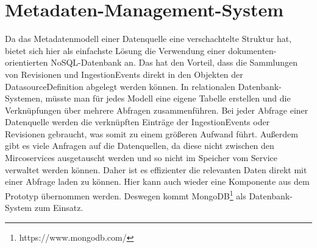 \section{Metadaten-Management-System}

Da das Metadatenmodell einer Datenquelle eine verschachtelte Struktur hat, bietet sich hier als einfachste Lösung die Verwendung einer dokumenten-orientierten NoSQL-Datenbank an.
Das hat den Vorteil, dass die Sammlungen von Revisionen und IngestionEvents direkt in den Objekten der DatasourceDefinition abgelegt werden können.
In relationalen Datenbank-Systemen, müsste man für jedes Modell eine eigene Tabelle erstellen und die Verknüpfungen über mehrere Abfragen zusammenführen.
Bei jeder Abfrage einer Datenquelle werden die verknüpften Einträge der IngestionEvents oder Revisionen gebraucht, was somit zu einem größeren Aufwand führt.
Außerdem gibt es viele Anfragen auf die Datenquellen, da diese nicht zwischen den Mircoservices ausgetauscht werden und so nicht im Speicher vom Service verwaltet werden können.
Daher ist es effizienter die relevanten Daten direkt mit einer Abfrage laden zu können.
Hier kann auch wieder eine Komponente aus dem Prototyp übernommen werden.
Deswegen kommt MongoDB\footnote{https://www.mongodb.com/} als Datenbank-System zum Einsatz.
